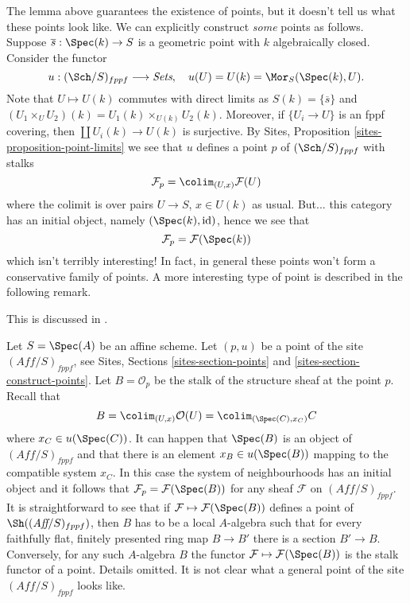 \noindent
The lemma above guarantees the existence of points, but it doesn't
tell us what these points look like. We can explicitly construct
{\it some} points as follows.
Suppose $\overline{s} : \Spec(k) \to S$ is a geometric
point with $k$ algebraically closed. Consider the functor
$$
u : (\Sch/S)_{fppf} \longrightarrow \textit{Sets},
\quad
u(U) = U(k) = \Mor_S(\Spec(k), U).
$$
Note that $U \mapsto U(k)$ commutes with direct limits as
$S(k) = \{\overline{s}\}$ and
$(U_1 \times_U U_2)(k) = U_1(k) \times_{U(k)} U_2(k)$.
Moreover, if $\{U_i \to U\}$ is an fppf covering, then
$\coprod U_i(k) \to U(k)$ is surjective.
By
Sites, Proposition \ref{sites-proposition-point-limits}
we see that $u$ defines a point $p$ of $(\Sch/S)_{fppf}$ with
stalks
$$
\mathcal{F}_p = \colim_{(U, x)} \mathcal{F}(U)
$$
where the colimit is over pairs $U \to S$, $x \in U(k)$ as usual.
But... this category has an initial object, namely
$(\Spec(k), \text{id})$, hence we see that
$$
\mathcal{F}_p = \mathcal{F}(\Spec(k))
$$
which isn't terribly interesting! In fact, in general these points won't
form a conservative family of points. A more interesting type of point
is described in the following remark.

\begin{remark}
\label{remark-points-fppf-site}
\begin{reference}
This is discussed in \cite{Schroeer}.
\end{reference}
Let $S = \Spec(A)$ be an affine scheme. Let $(p, u)$ be a point of
the site $(\textit{Aff}/S)_{fppf}$, see
Sites, Sections \ref{sites-section-points} and
\ref{sites-section-construct-points}. Let $B = \mathcal{O}_p$ be the stalk
of the structure sheaf at the point $p$. Recall that
$$
B = \colim_{(U, x)} \mathcal{O}(U) =
\colim_{(\Spec(C), x_C)} C
$$
where $x_C \in u(\Spec(C))$. It can happen that
$\Spec(B)$ is an object of $(\textit{Aff}/S)_{fppf}$
and that there is an element $x_B \in u(\Spec(B))$ mapping to
the compatible system $x_C$. In this case the system of neighbourhoods
has an initial object and it follows that
$\mathcal{F}_p = \mathcal{F}(\Spec(B))$ for any sheaf $\mathcal{F}$
on $(\textit{Aff}/S)_{fppf}$. It is straightforward
to see that if $\mathcal{F} \mapsto \mathcal{F}(\Spec(B))$ defines a point
of $\Sh((\textit{Aff}/S)_{fppf})$, then
$B$ has to be a local $A$-algebra such that for every faithfully flat,
finitely presented ring map $B \to B'$ there is a section $B' \to B$.
Conversely, for any such $A$-algebra $B$ the functor
$\mathcal{F} \mapsto \mathcal{F}(\Spec(B))$ is the stalk functor
of a point. Details omitted. It is not clear what a general point of the
site $(\textit{Aff}/S)_{fppf}$ looks like.
\end{remark}











